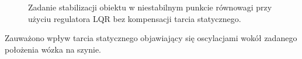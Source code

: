 \begin{figure}[H]
	\caption{Zadanie stabilizacji obiektu w niestabilnym punkcie równowagi przy użyciu regulatora LQR bez kompensacji tarcia statycznego.}
\label{fig:LQRbezKom}
\end{figure}

Zauważono wpływ tarcia statycznego objawiający się oscylacjami wokół zadanego położenia wózka na szynie.
